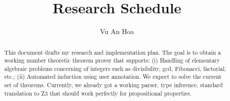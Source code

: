 \documentclass{article}
\title{Research Schedule}
\author{Vu An Hoa}
\begin{document}
\maketitle

\begin{abstract}
\begin{scriptsize}
This document drafts my research and implementation plan. The goal is to obtain a working number theoretic theorem prover that supports: (i) Handling of elementary algebraic problems concerning of integers such as divisibility, gcd, Fibonacci, factorial, etc.; (ii) Automated induction using user annotation. We expect to solve the current set of theorems. Currently, we already got a working parser, type inference, standard translation to Z3 that should work perfectly for propositional properties.
\end{scriptsize}
\end{abstract}
\end{document}
